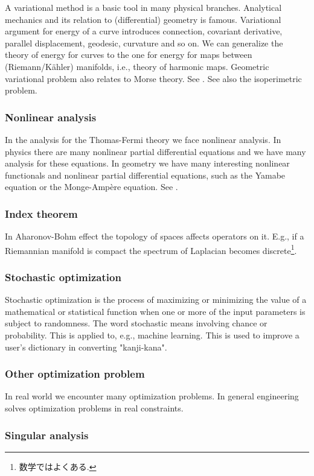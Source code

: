 \documentclass[openany, a4paper, oneside]{jsbook}
\begin{document}
A variational method is a basic tool in many physical branches.
Analytical mechanics and its relation to (differential) geometry is famous.
Variational argument for energy of a curve introduces connection,
covariant derivative, parallel displacement, geodesic, curvature and so on.
We can generalize the theory of energy for curves to the one for energy for maps between (Riemann/K\"ahler) manifolds,
i.e., theory of harmonic maps.
Geometric variational problem also relates to Morse theory.
See \cite{SeikiNishikawa1}.
See also the isoperimetric problem.
\subsubsection{Nonlinear analysis}

In the analysis for the Thomas-Fermi theory we face nonlinear analysis.
In physics there are many nonlinear partial differential equations
and we have many analysis for these equations.
In geometry we have many interesting nonlinear functionals and nonlinear partial differential equations,
such as the Yamabe equation or the Monge-Amp\`ere equation.
See \cite{ThierryAubin1}.
\subsubsection{Index theorem}

In Aharonov-Bohm effect the topology of spaces affects operators on it.
E.g., if a Riemannian manifold is compact the spectrum of Laplacian becomes discrete\footnote{数学ではよくある.}.
\subsubsection{Stochastic optimization}

Stochastic optimization is the process of maximizing or minimizing
the value of a mathematical or statistical function when one or more of the input parameters is subject to randomness.
The word stochastic means involving chance or probability.
This is applied to, e.g., machine learning.
This is used to improve a user's dictionary in converting "kanji-kana".
\subsubsection{Other optimization problem}

In real world we encounter many optimization problems.
In general engineering solves optimization problems in real constraints.
\subsubsection{Singular analysis}
\end{document}
